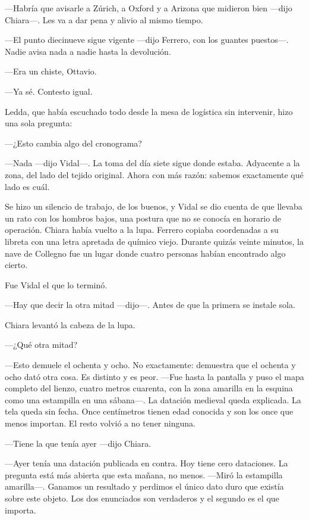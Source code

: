 ---Habría que avisarle a Zúrich, a Oxford y a Arizona que midieron bien ---dijo Chiara---. Les va a dar pena y alivio al mismo tiempo.

---El punto diecinueve sigue vigente ---dijo Ferrero, con los guantes puestos---. Nadie avisa nada a nadie hasta la devolución.

---Era un chiste, Ottavio.

---Ya sé. Contesto igual.

Ledda, que había escuchado todo desde la mesa de logística sin intervenir, hizo una sola pregunta:

---¿Esto cambia algo del cronograma?

---Nada ---dijo Vidal---. La toma del día siete sigue donde estaba. Adyacente a la zona, del lado del tejido original. Ahora con más razón: sabemos exactamente qué lado es cuál.

Se hizo un silencio de trabajo, de los buenos, y Vidal se dio cuenta de que llevaba un rato con los hombros bajos, una postura que no se conocía en horario de operación. Chiara había vuelto a la lupa. Ferrero copiaba coordenadas a su libreta con una letra apretada de químico viejo. Durante quizás veinte minutos, la nave de Collegno fue un lugar donde cuatro personas habían encontrado algo cierto.

Fue Vidal el que lo terminó.

---Hay que decir la otra mitad ---dijo---. Antes de que la primera se instale sola.

Chiara levantó la cabeza de la lupa.

---¿Qué otra mitad?

---Esto demuele el ochenta y ocho. No exactamente: demuestra que el ochenta y ocho dató otra cosa. Es distinto y es peor. ---Fue hasta la pantalla y puso el mapa completo del lienzo, cuatro metros cuarenta, con la zona amarilla en la esquina como una estampilla en una sábana---. La datación medieval queda explicada. La tela queda sin fecha. Once centímetros tienen edad conocida y son los once que menos importan. El resto volvió a no tener ninguna.

---Tiene la que tenía ayer ---dijo Chiara.

---Ayer tenía una datación publicada en contra. Hoy tiene cero dataciones. La pregunta está más abierta que esta mañana, no menos. ---Miró la estampilla amarilla---. Ganamos un resultado y perdimos el único dato duro que existía sobre este objeto. Los dos enunciados son verdaderos y el segundo es el que importa.

